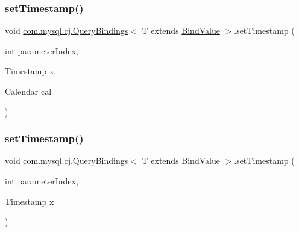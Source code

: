 \subsubsection{\texorpdfstring{set\+Timestamp()}{setTimestamp()}\hspace{0.1cm}{\footnotesize\ttfamily [1/3]}}
{\footnotesize\ttfamily void \mbox{\hyperlink{interfacecom_1_1mysql_1_1cj_1_1_query_bindings}{com.\+mysql.\+cj.\+Query\+Bindings}}$<$ T extends \mbox{\hyperlink{interfacecom_1_1mysql_1_1cj_1_1_bind_value}{Bind\+Value}} $>$.set\+Timestamp (\begin{DoxyParamCaption}\item[{int}]{parameter\+Index,  }\item[{Timestamp}]{x,  }\item[{Calendar}]{cal }\end{DoxyParamCaption})}

\mbox{\label{interfacecom_1_1mysql_1_1cj_1_1_query_bindings_a08628284155246e9312c6c3dcd6ee54f}} 
\subsubsection{\texorpdfstring{set\+Timestamp()}{setTimestamp()}\hspace{0.1cm}{\footnotesize\ttfamily [2/3]}}
{\footnotesize\ttfamily void \mbox{\hyperlink{interfacecom_1_1mysql_1_1cj_1_1_query_bindings}{com.\+mysql.\+cj.\+Query\+Bindings}}$<$ T extends \mbox{\hyperlink{interfacecom_1_1mysql_1_1cj_1_1_bind_value}{Bind\+Value}} $>$.set\+Timestamp (\begin{DoxyParamCaption}\item[{int}]{parameter\+Index,  }\item[{Timestamp}]{x }\end{DoxyParamCaption})}

\mbox{\label{interfacecom_1_1mysql_1_1cj_1_1_query_bindings_aac572e044c4913263d2d078ac54e4043}} 
